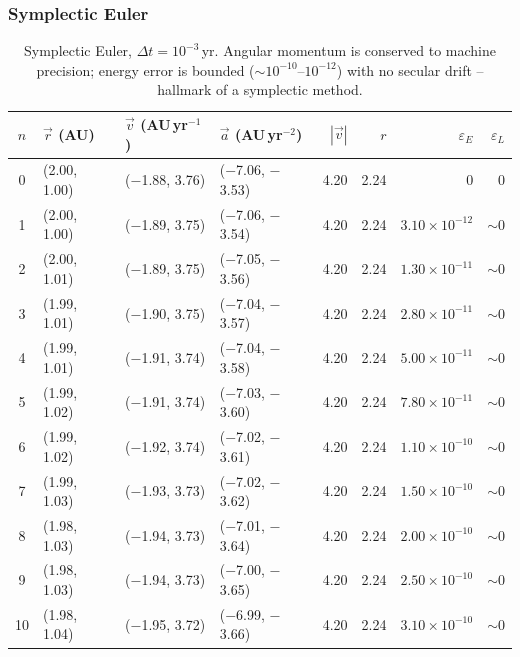 \subsubsection*{Symplectic Euler}

\begin{table}[H]
    \centering
    \scriptsize
    \setlength{\tabcolsep}{4pt}
    \begin{tabular}{c l l l r r r r}
        \hline
        $n$ & $\vec{r}$ (AU) & $\vec{v}$ (AU\,yr$^{-1}$) & $\vec{a}$ (AU\,yr$^{-2}$) & $|\vec{v}|$ & $r$ & $\varepsilon_E$ & $\varepsilon_L$ \\
        \hline
        0  & (2.00, 1.00) & ($-$1.88, 3.76)  & ($-$7.06, $-$3.53) & 4.20 & 2.24 & $0$ & $0$ \\
        1  & (2.00, 1.00) & ($-$1.89, 3.75)  & ($-$7.06, $-$3.54) & 4.20 & 2.24 & $3.10\!\times\!10^{-12}$ & $\sim\!0$ \\
        2  & (2.00, 1.01) & ($-$1.89, 3.75)  & ($-$7.05, $-$3.56) & 4.20 & 2.24 & $1.30\!\times\!10^{-11}$ & $\sim\!0$ \\
        3  & (1.99, 1.01) & ($-$1.90, 3.75)  & ($-$7.04, $-$3.57) & 4.20 & 2.24 & $2.80\!\times\!10^{-11}$ & $\sim\!0$ \\
        4  & (1.99, 1.01) & ($-$1.91, 3.74)  & ($-$7.04, $-$3.58) & 4.20 & 2.24 & $5.00\!\times\!10^{-11}$ & $\sim\!0$ \\
        5  & (1.99, 1.02) & ($-$1.91, 3.74)  & ($-$7.03, $-$3.60) & 4.20 & 2.24 & $7.80\!\times\!10^{-11}$ & $\sim\!0$ \\
        6  & (1.99, 1.02) & ($-$1.92, 3.74)  & ($-$7.02, $-$3.61) & 4.20 & 2.24 & $1.10\!\times\!10^{-10}$ & $\sim\!0$ \\
        7  & (1.99, 1.03) & ($-$1.93, 3.73)  & ($-$7.02, $-$3.62) & 4.20 & 2.24 & $1.50\!\times\!10^{-10}$ & $\sim\!0$ \\
        8  & (1.98, 1.03) & ($-$1.94, 3.73)  & ($-$7.01, $-$3.64) & 4.20 & 2.24 & $2.00\!\times\!10^{-10}$ & $\sim\!0$ \\
        9  & (1.98, 1.03) & ($-$1.94, 3.73)  & ($-$7.00, $-$3.65) & 4.20 & 2.24 & $2.50\!\times\!10^{-10}$ & $\sim\!0$ \\
        10 & (1.98, 1.04) & ($-$1.95, 3.72)  & ($-$6.99, $-$3.66) & 4.20 & 2.24 & $3.10\!\times\!10^{-10}$ & $\sim\!0$ \\
        \hline
    \end{tabular}
    \caption{Symplectic Euler, $\Delta t = 10^{-3}$\,yr. Angular momentum is conserved to machine precision; energy error is bounded ($\sim\!10^{-10}$--$10^{-12}$) with no secular drift -- hallmark of a symplectic method.}
\end{table}

